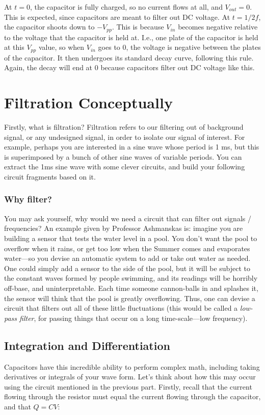 \documentclass[12pt]{report}
\newcommand{\Vpp}{{ V}_{ pp}}
\newcommand{\Vo}{{V}_{out}}
\newcommand{\Vi}{{V}_{in}}
\begin{document}
At $t=0$, the capacitor is fully charged, so no current flows at all, and $\Vo = 0$. This is expected, since capacitors are meant to filter out DC voltage. At $t = 1/2f$, the capacitor shoots down to $-\Vpp$. This is because $\Vi$ becomes negative relative to the voltage that the capacitor is held at. I.e., one plate of the capacitor is held at this $\Vpp$ value, so when $\Vi$ goes to 0, the voltage is negative between the plates of the capacitor. It then undergoes its standard decay curve, following this rule. Again, the decay will end at 0 because capacitors filter out DC voltage like this. 


\section{Filtration Conceptually}

Firstly, what is filtration? Filtration refers to our filtering out of background signal, or any undesigned signal, in order to isolate our signal of interest. For example, perhaps you are interested in a sine wave whose period is 1 ms, but this is superimposed by a bunch of other sine waves of variable periods. You can extract the 1ms sine wave with some clever circuits, and build your following circuit fragments based on it. 

\subsubsection{Why filter?}
You may ask yourself, why would we need a circuit that can filter out signals / frequencies? An example given by Professor Ashmanskas is: imagine you are building a sensor that tests the water level in a pool. You don't want the pool to overflow when it rains, or get too low when the Summer comes and evaporates water---so you devise an automatic system to add or take out water as needed. One could simply add a sensor to the side of the pool, but it will be subject to the constant waves formed by people swimming, and its readings will be horribly off-base, and uninterpretable. Each time someone cannon-balls in and splashes it, the sensor will think that the pool is greatly overflowing. Thus, one can devise a circuit that filters out all of these little fluctuations (this would be called a \textit{low-pass filter}, for passing things that occur on a long time-scale---low frequency).


\subsection{Integration and Differentiation}
Capacitors have this incredible ability to perform complex math, including taking derivatives or integrals of your wave form. Let's think about how this may occur using the circuit mentioned in the previous part. Firstly, recall that the current flowing through the resistor must equal the current flowing through the capacitor, and that $Q = CV$: 
\end{document}
